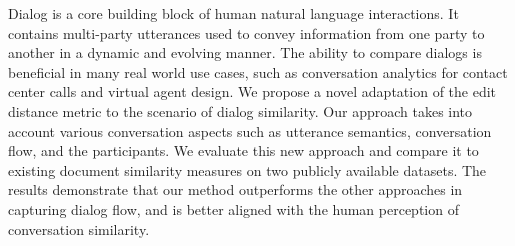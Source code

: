 Dialog is a core building block of human natural language interactions. It contains multi-party utterances used to convey information from one party to another in a dynamic and evolving manner. The ability to compare dialogs is beneficial in many real world use cases, such as conversation analytics for contact center calls and virtual agent design. We propose a novel adaptation of the edit distance metric to the scenario of dialog similarity. Our approach takes into account various conversation aspects such as utterance semantics, conversation flow, and the participants. We evaluate this new approach and compare it to existing document similarity measures on two publicly available datasets. The results demonstrate that our method outperforms the other approaches in capturing dialog flow, and is better aligned with the human perception of conversation similarity.
